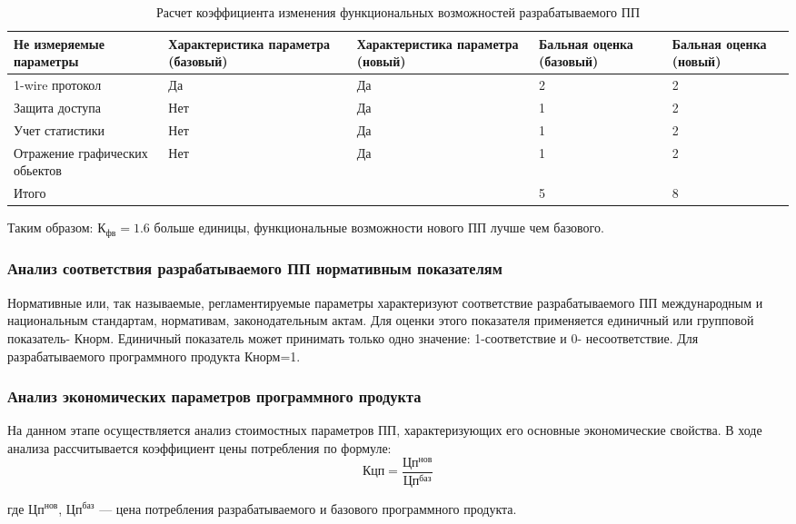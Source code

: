 \begin{table}
\caption{Расчет коэффициента изменения функциональных возможностей разрабатываемого ПП}
\begin{tabular}{|p{3cm}|p{3cm}|p{3cm}|p{3cm}|p{3cm}|}
\hline{}
Не измеряемые параметры & Характе\-ристика параметра (базовый) & Характе\-ристика параметра (новый) & Бальная оценка (базовый) & Бальная оценка (новый) \\
\hline{}
1-wire протокол & Да & Да & 2 & 2 \\
\hline{}
Защита доступа & Нет & Да & 1 & 2 \\
\hline{}
Учет статистики & Нет & Да & 1 & 2 \\
\hline{}
Отражение графических обьектов & Нет & Да & 1 & 2 \\
\hline{}
Итого & & & 5 & 8 \\
\hline
\end{tabular}
\label{table:calcKoefTechProgress}
\end{table}

Таким образом: $\textrm{К}_\textrm{фв} = 1.6$  больше единицы, функциональные возможности нового ПП лучше чем базового.



\subsubsection{Анализ соответствия разрабатываемого ПП нормативным показателям}
Нормативные или, так называемые, регламентируемые параметры характеризуют соответствие разрабатываемого
ПП международным и национальным стандартам, нормативам, законодательным актам. Для оценки этого
показателя применяется единичный или групповой показатель- Кнорм. Единичный показатель может принимать
только одно значение: 1-соответствие и 0- несоответствие. Для разрабатываемого программного продукта Кнорм=1.


\subsubsection{Анализ экономических параметров программного продукта}
На данном этапе осуществляется анализ стоимостных параметров ПП, характеризующих его основные экономические свойства.
В ходе анализа рассчитывается коэффициент цены потребления по  формуле:
\begin{equation}Кцп = \frac{Цп^{нов}}{Цп^{баз}}\end{equation}

\begin{ESKDexplanation}
	\item[где ] $Цп^{нов}$, $Цп^{баз}$ --- цена потребления разрабатываемого и базового программного продукта.
\end{ESKDexplanation}

